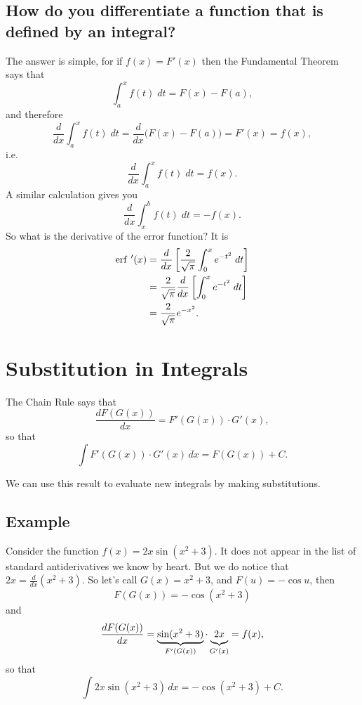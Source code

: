 \subsection{How do you differentiate a function that is defined by an integral?} %
The answer is simple, for if $f(x) = F'(x)$ then the Fundamental Theorem says
that
\[
\int_a^x f(t) \; dt = F(x) - F(a),
\]
and therefore
\[
\frac d{dx} \int_a^x f(t) \; dt =\frac d{dx}\bigl( F(x) - F(a)\bigr) = F'(x) =
f(x),
\]%
i.e.
\[
\frac d{dx} \int_a^x f(t) \; dt = f(x).
\]
A similar calculation gives you
\[
\frac d{dx} \int_x^b f(t) \; dt = -f(x).
\]
So what is the derivative of the error function?
It is
\begin{align*}
  {\mathrm{erf\,}}\, '(x) 
  &= \frac d{dx} \left[ \frac2{\sqrt\pi} \int _0 ^x e^{-t^2}\;dt\right] \\
  &= \frac2{\sqrt\pi} \frac d{dx} \left[\int _0 ^x e^{-t^2}\;dt\right] \\
  &=  \frac2{\sqrt\pi} e^{-x^2}.
\end{align*}


\section{Substitution in Integrals} %
\label{sec:method-substitution}
The Chain Rule says that
\[
\frac{d F(G(x))}{d x } = F'(G(x))\cdot G'(x),
\]
so that
\[
\int F'(G(x))\cdot G'(x) \,d x = F(G(x)) +C.
\]

We can use this result to evaluate new integrals by making substitutions.

\subsection{Example} %
Consider the function $f(x) = 2x\sin (x^2+3)$. It does not appear in
the list of standard antiderivatives we know by heart. But we do
notice that $2x =
\frac{d}{dx} (x^2+3)$. So let's call $G(x)=x^2+3$, and $F(u) = -\cos
u$, then
\[
F(G(x)) = -\cos (x^2+3)
\]
and
\[
\frac{dF(G(x))}{dx} = \underbrace{\sin (x^2+3)}_{F'(G(x))}\cdot
\underbrace{\vphantom{(}2x}_{G'(x)} = f(x),
\]
so that
\begin{equation}
  \label{eq:substitution-example1}
  \int 2x\sin (x^2+3)\,d x = -\cos (x^2+3)+C.
\end{equation}



